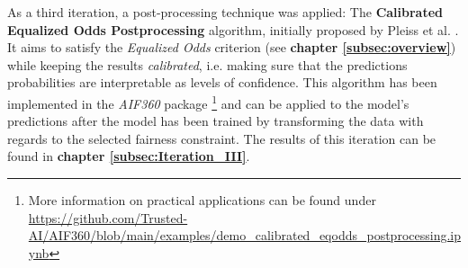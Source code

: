 As a third iteration, a post-processing technique was applied: The \textbf{Calibrated Equalized Odds Postprocessing} algorithm, initially proposed by Pleiss et al. \parencite{Pleiss2017}. It aims to satisfy the \textit{Equalized Odds} criterion (see \textbf{chapter \ref{subsec:overview}}) while keeping the results \textit{calibrated}, i.e. making sure that the predictions probabilities are interpretable as levels of confidence.
This algorithm has been implemented in the \textit{AIF360} package \footnote{More information on practical applications can be found under \url{https://github.com/Trusted-AI/AIF360/blob/main/examples/demo_calibrated_eqodds_postprocessing.ipynb}} and can be applied to the model's predictions after the model has been trained by transforming the data with regards to the selected fairness constraint. The results of this iteration can be found in \textbf{chapter \ref{subsec:Iteration_III}}. 

